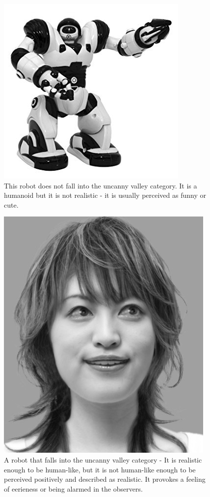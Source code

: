 \begin{figure}[!ht]
\centerline{\includegraphics[scale=0.4]{img/toyrobot.jpg}}
\caption{This robot does not fall into the uncanny valley category. It is a humanoid but it is not realistic - it is usually perceived as funny or cute.}\label{fig:toyrobot}
\end{figure}

\begin{figure}[!ht]
\centerline{\includegraphics[scale=0.4]{img/uncannyrobot.png}}
\caption{A robot that falls into the uncanny valley category - It is realistic enough to be human-like, but it is not human-like enough to be perceived positively and described as realistic. It provokes a feeling of eerieness or being alarmed in the observers.}\label{fig:uncannyrobot}
\end{figure}

